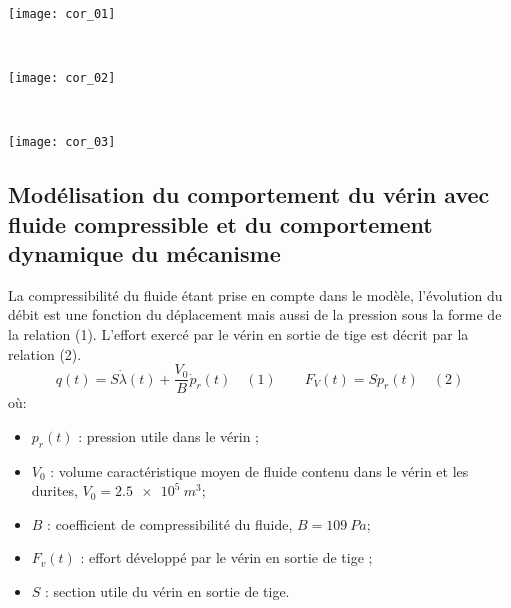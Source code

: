 \ifprof
\begin{corrige} ~\\

\begin{center}
\texttt{[image: cor\_01]}
\end{center}
\end{corrige}
\else
\fi

 \ifprof
\begin{corrige} ~\\

\begin{center}
\texttt{[image: cor\_02]}
\end{center}
\end{corrige}
\else
\fi



\ifprof
\begin{corrige}~\\
\begin{center}
\texttt{[image: cor\_03]}
\end{center}    
\end{corrige}
\else
\fi

\subsection*{Modélisation du comportement du vérin avec fluide compressible et du comportement dynamique du mécanisme}

La compressibilité du fluide étant prise en compte dans le modèle, l'évolution du débit est une fonction du déplacement mais aussi de la pression sous la forme de la relation (1). L'effort exercé par le vérin en sortie de tige est décrit par la relation (2).
$$
q(t)=S\dot{\lambda}(t)+\dfrac{V_0}{B}\dot{p}_r(t) \quad (1) \quad\quad
F_V(t)=Sp_r(t) \quad (2)
$$
où:
\begin{itemize}
\item $p_r(t)$ : pression utile dans le vérin ;
\item $V_0$ : volume caractéristique moyen de fluide contenu dans le vérin et les durites, $V_0 = \SI{2,5e5}{m^3}$;
\item $B$ : coefficient de compressibilité du fluide, $B = \SI{109}{Pa}$;
\item $F_v(t)$ : effort développé par le vérin en sortie de tige ;
\item $S$ : section utile du vérin en sortie de tige.
\end{itemize}

